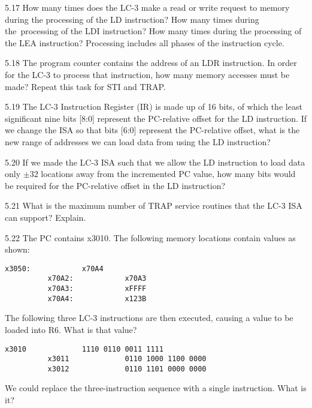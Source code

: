 \documentclass{patt}
\begin{document}
\begin{exercises}
\item[5.17] How many times does the LC-3 make a read or write request
  to memory during the processing of the LD instruction? How many
  times during the~processing of the LDI instruction? How many times
  during the processing of the LEA instruction? Processing includes
  all phases of the instruction cycle.

\item[5.18] The program counter contains the address of an LDR
  instruction. In order for the LC-3 to process that instruction, how
  many memory accesses must be made? Repeat this task for STI and
  TRAP.

\item[5.19] The LC-3 Instruction Register (IR) is made up of 16 bits,
  of which the least significant nine bits [8:0] represent the
  PC-relative offset for the LD instruction. If we change the ISA so
  that bits [6:0] represent the PC-relative offset, what is the new
  range of addresses we can load data from using the LD instruction?

\item[5.20] If we made the LC-3 ISA such that we allow the LD
  instruction to load data only $\pm32$ locations away from the
  incremented PC value, how many bits would be required for the
  PC-relative offset in the LD instruction?

\item[5.21] What is the maximum number of TRAP service routines that
  the LC-3 ISA can support? Explain.

\item[5.22] The PC contains x3010. The following memory locations
  contain values as shown:
\medskip
\color{seventyblack}
\begin{Verbatim}[fontsize=\fontsize{9}{14}\selectfont]
          x3050:            x70A4
          x70A2:            x70A3
          x70A3:            xFFFF
          x70A4:            x123B
\end{Verbatim}
\medskip
\normalcolor
The following three LC-3 instructions are then executed, causing a
value to be loaded into R6. What is that value?
\color{seventyblack}
\medskip
\begin{Verbatim}[fontsize=\fontsize{9}{14}\selectfont]
          x3010             1110 0110 0011 1111
          x3011             0110 1000 1100 0000
          x3012             0110 1101 0000 0000
\end{Verbatim}
\medskip
\normalcolor
We could replace the three-instruction sequence with a single
instruction. What is it?


\end{exercises}
\end{document}
